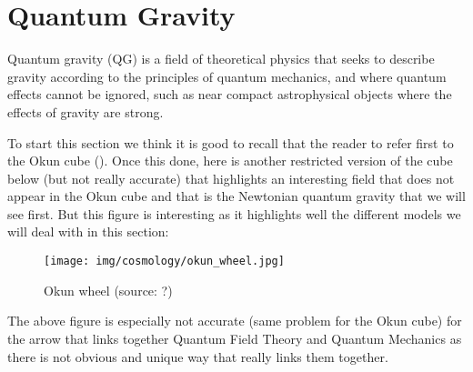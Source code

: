 	\newpage
	\thispagestyle{empty}
	\mbox{}
	\section{Quantum Gravity}\label{quantum Gravity}
	Quantum gravity (QG) is a field of theoretical physics that seeks to describe gravity according to the principles of quantum mechanics, and where quantum effects cannot be ignored, such as near compact astrophysical objects where the effects of gravity are strong.
	
	To start this section we think it is good to recall that the reader to refer first to the Okun cube (). Once this done, here is another restricted version of the cube below (but not really accurate)  that highlights an interesting field that does not appear in the Okun cube and that is the Newtonian quantum gravity that we will see first. But this figure is interesting as it highlights well the different models we will deal with in this section:
	\begin{figure}[H]
		\begin{center}
		\texttt{[image: img/cosmology/okun\_wheel.jpg]}
		\end{center}	
		\caption[Okun wheel]{Okun wheel (source: ?)}
	\end{figure}
	\begin{tcolorbox}[title=Remark,colframe=black,arc=10pt]
	The above figure is especially not accurate (same problem for the Okun cube) for the arrow that links together Quantum Field Theory and Quantum Mechanics as there is not obvious and unique way that really links them together.
	\end{tcolorbox}
	

